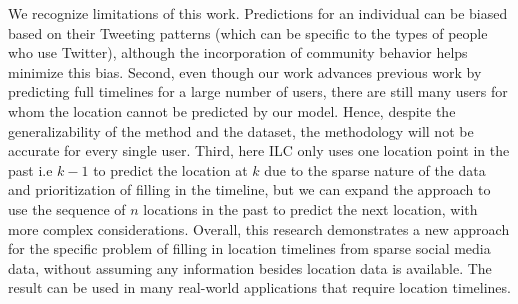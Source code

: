 We recognize limitations of this work. Predictions for an individual can be biased based on their Tweeting patterns (which can be specific to the types of people who use Twitter), although the incorporation of community behavior helps minimize this bias. Second, even though our work advances previous work by predicting full timelines for a large number of users, there are still many users for whom the location cannot be predicted by our model. Hence, despite the generalizability of the method and the dataset, the methodology will not be accurate for every single user. Third, here ILC only uses one location point in the past i.e $k-1$ to predict the location at $k$ due to the sparse nature of the data and prioritization of filling in the timeline, but we can expand the approach to use the sequence of $n$ locations in the past to predict the next location, with more complex considerations. Overall, this research demonstrates a new approach for the specific problem of filling in location timelines from sparse social media data, without assuming any information besides location data is available. The result can be used in many real-world applications that require location timelines.








 










